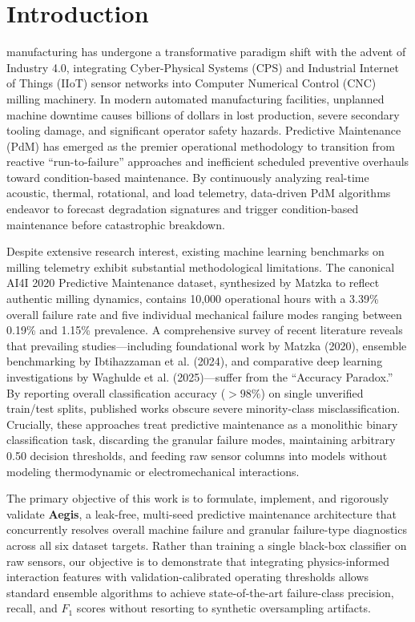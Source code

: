 \documentclass[conference]{IEEEtran}
\begin{document}
\section{Introduction}

 manufacturing has undergone a transformative paradigm shift with the advent of Industry 4.0, integrating Cyber-Physical Systems (CPS) and Industrial Internet of Things (IIoT) sensor networks into Computer Numerical Control (CNC) milling machinery. In modern automated manufacturing facilities, unplanned machine downtime causes billions of dollars in lost production, severe secondary tooling damage, and significant operator safety hazards. Predictive Maintenance (PdM) has emerged as the premier operational methodology to transition from reactive ``run-to-failure'' approaches and inefficient scheduled preventive overhauls toward condition-based maintenance. By continuously analyzing real-time acoustic, thermal, rotational, and load telemetry, data-driven PdM algorithms endeavor to forecast degradation signatures and trigger condition-based maintenance before catastrophic breakdown.

Despite extensive research interest, existing machine learning benchmarks on milling telemetry exhibit substantial methodological limitations. The canonical AI4I 2020 Predictive Maintenance dataset, synthesized by Matzka to reflect authentic milling dynamics, contains 10,000 operational hours with a 3.39\% overall failure rate and five individual mechanical failure modes ranging between 0.19\% and 1.15\% prevalence. A comprehensive survey of recent literature reveals that prevailing studies—including foundational work by Matzka (2020), ensemble benchmarking by Ibtihazzaman et al. (2024), and comparative deep learning investigations by Waghulde et al. (2025)—suffer from the ``Accuracy Paradox.'' By reporting overall classification accuracy ($>98\%$) on single unverified train/test splits, published works obscure severe minority-class misclassification. Crucially, these approaches treat predictive maintenance as a monolithic binary classification task, discarding the granular failure modes, maintaining arbitrary 0.50 decision thresholds, and feeding raw sensor columns into models without modeling thermodynamic or electromechanical interactions.

The primary objective of this work is to formulate, implement, and rigorously validate \textbf{Aegis}, a leak-free, multi-seed predictive maintenance architecture that concurrently resolves overall machine failure and granular failure-type diagnostics across all six dataset targets. Rather than training a single black-box classifier on raw sensors, our objective is to demonstrate that integrating physics-informed interaction features with validation-calibrated operating thresholds allows standard ensemble algorithms to achieve state-of-the-art failure-class precision, recall, and $F_1$ scores without resorting to synthetic oversampling artifacts.
\end{document}
